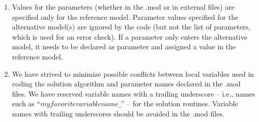 \documentclass[12pt]{article}
\begin{document}
\begin{enumerate}
\item Values for the parameters (whether in the .mod or in external files)
are specified only for the reference model. Parameter values specified for
the alternative model(s) are ignored by the code (but not the list of
parameters, which is used for an error check). If a parameter only enters
the alternative model, it needs to be declared as parameter and assigned a
value in the reference model.

\item We have strived to minimize possible conflicts between local variables used in coding the solution algorithm and parameter names declared in the .mod files.  We have reserved variable names with a trailing underscore -- i.e., names such as ``$myfavoritevariablename\_$'' -- 
for the solution routines. Variable names with trailing underscores should be avoided in the .mod files.

\end{enumerate}
\end{document}

